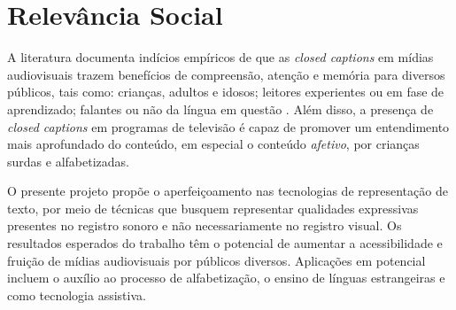 \documentclass[a4paper,11pt,titlepage,singlespacing]{article}
\begin{document}
\newpage


\thispagestyle{empty}
\newpage


\newpage

\section*{Relevância Social}

\noindent A literatura documenta indícios empíricos de que as \emph{closed captions} em mídias audiovisuais trazem benefícios de compreensão, atenção e memória para diversos públicos, tais como: crianças, adultos e idosos; leitores experientes ou em fase de aprendizado; falantes ou não da língua em questão \cite{fiske_video_2015}. Além disso, a presença de \emph{closed captions} em programas de televisão é capaz de promover um entendimento mais aprofundado do conteúdo, em especial o conteúdo \emph{afetivo}, por crianças surdas e alfabetizadas\cite{murphy-berman_impact_1983}.

O presente projeto propõe o aperfeiçoamento nas tecnologias de representação de texto, por meio de técnicas que busquem representar qualidades expressivas presentes no registro sonoro e não necessariamente no registro visual. Os resultados esperados do trabalho têm o potencial de aumentar a acessibilidade e fruição de mídias audiovisuais por públicos diversos. Aplicações em potencial incluem o auxílio ao processo de alfabetização, o ensino de línguas estrangeiras e como tecnologia assistiva.





\end{document}
